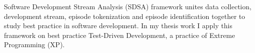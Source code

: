 Software Development Stream Analysis (SDSA) framework unites data collection, 
development stream, episode tokenization and episode identification together 
to study best practice in software development. In my thesis work I apply this 
framework on best practice Test-Driven Development, a practice of Extreme 
Programming (XP).

